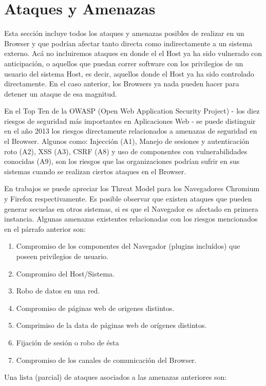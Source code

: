 \section{Ataques y Amenazas}
Esta sección incluye todos los ataques y amenazas posibles de realizar en un Browser y que podrían afectar tanto directa como indirectamente a un sistema externo. Acá no incluiremos ataques en donde el el Host ya ha sido vulnerado con anticipación, o aquellos que puedan correr software con los privilegios de un usuario del sistema Host, es decir, aquellos donde el Host ya ha sido controlado directamente. En el caso anterior, los Browsers ya nada pueden hacer para detener un ataque de esa magnitud.

En el Top Ten \cite{owaspTopTen} de la OWASP (Open Web Application Security Project) - los diez riesgos de seguridad más importantes en Aplicaciones Web - se puede distinguir en el año 2013 los riesgos directamente relacionados a amenazas de seguridad en el Browser. Algunos como: Injección (A1), Manejo de sesiones y autenticación roto (A2), XSS (A3), CSRF (A8) y uso de componentes con vulnerabilidades conocidas (A9), son los riesgos que las organizaciones podrían sufrir en sus sistemas cuando se realizan ciertos ataques en el Browser.

En trabajos \cite{barth2008security, FirefoxThreatModel} se puede apreciar los Threat Model para los Navegadores Chromium y Firefox respectivamente. Es posible observar que existen ataques que pueden generar secuelas en otros sistemas, si es que el Navegador es afectado en primera instancia. Algunas amenazas existentes relacionadas con los riesgos mencionados en el párrafo anterior son:

\begin{enumerate}
	\item Compromiso de los componentes del Navegador (plugins incluídos) que poseen privilegios de usuario.
	\item Compromiso del Host/Sistema.
	\item Robo de datos en una red.
	\item Compromiso de páginas web de origenes distintos.
	\item Comprimiso de la data de páginas web de orígenes distintos.
	\item Fijación de sesión o robo de ésta
	\item Compromiso de los canales de comunicación del Browser.
\end{enumerate}

Una lista (parcial) de ataques asociados a las amenazas anteriores son:

